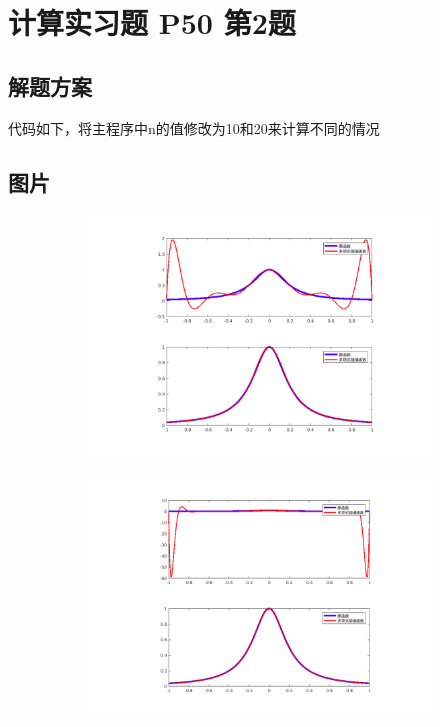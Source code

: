\documentclass[a4paper]{article}
\begin{document}
\section{计算实习题 P50 第2题}
\subsection{解题方案}
	代码如下，将主程序中n的值修改为10和20来计算不同的情况
\subsection{图片}
	\begin{figure}[ht]
		\begin{subfigure}[t]{0.5\textwidth}
		\centering
		\includegraphics[width=1.2\textwidth]{figure/n10bmp.pdf}
		\end{subfigure}
		\quad
		\begin{subfigure}[t]{0.5\textwidth}
		\centering
		\includegraphics[width=1.2\textwidth]{figure/n20bmp.pdf}
		\end{subfigure}
	\end{figure}
\end{document}
